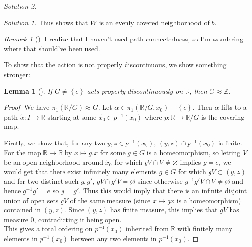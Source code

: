 \documentclass[reqno]{amsart}
\newtheorem{lemma}[theorem]{Lemma}
\theoremstyle{definition}
\theoremstyle{remark}
\newtheorem*{remark}{Remark}
\newtheorem*{solution}{Solution}
\begin{document}
\begin{solution}
\begin{solution}
            Thus shows that $W$ is an evenly covered
            neighborhood of $b$.
        \end{solution}

        \begin{remark}[]
            I realize that I haven't used path-connectedness, so
            I'm wondering where that should've been used.
        \end{remark}


        \newpage

        To show that the action is not properly discontinuous,
        we show something stronger:
        \begin{lemma}[]
            If $G \neq \left\{ e \right\} $ acts
            properly discontinuously on $\mathbb{R}$, then
            $G \approx \mathbb{Z}$.
        \end{lemma}

        \begin{proof}
            We have $\pi_1 \left( \mathbb{R} / G \right) 
            \approx G$. Let $\alpha \in 
            \pi_1 \left( \mathbb{R} / G, x_0 \right) -
            \left\{ e \right\} $. Then
            $\alpha$ lifts to a path $\tilde{\alpha}
            \colon I \to \mathbb{R}$ starting
            at some $\tilde{x_0}\in p^{-1}(x_0)$ 
            where $p \colon \mathbb{R} \to \mathbb{R} /G$ is
            the covering map.\\
            \linebreak
            

            Firstly, we show that, for any
            two $y,z \in p^{-1}(x_0)$,
            $\left( y,z \right) \cap p^{-1}(x_0)$ is finite.
            For the map $\mathbb{R} \to \mathbb{R}$ by
            $x\mapsto g.x$ for some $g \in G$ is a homeomorphism,
            so letting $V$ be an open
            neighborhood around $\tilde{x_0}$ for
            which $g V \cap V \neq \varnothing$ implies
            $g = e$, we would get
            that there exist infinitely many elements
            $g \in G$ for which $g V \subset 
            \left( y,z \right) $ and for
            two distinct such $g,g'$, 
            $gV \cap g'V = \varnothing$ since
            otherwise $g^{-1}g' V \cap V \neq \varnothing$ and
            hence $g^{-1} g' = e$ so
            $g = g'$. Thus this would imply that
            there is an infinite disjoint union of
            open sets $gV$ of the same measure (since $x \mapsto 
            gx$ is a homeomorphism) contained in
            $\left( y,z \right) $. Since
            $\left( y,z \right) $ has finite measure, 
            this implies that
            $g V$ has measure $0$, contradicting it being open.\\
            \linebreak
            This gives a total ordering
            on $p^{-1}(x_0)$ inherited from
            $\mathbb{R}$ with finitely many elements
            in $p^{-1}(x_0)$ between any two elements
            in $p^{-1}(x_0)$.
            

\end{proof}
\end{solution}
\end{document}
